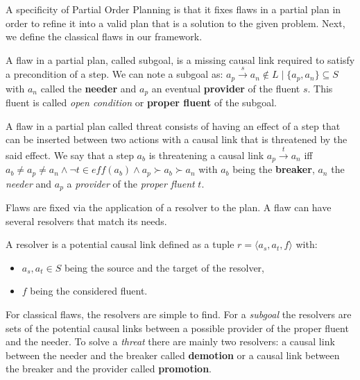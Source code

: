 A specificity of Partial Order Planning is that it fixes flaws in a
partial plan in order to refine it into a valid plan that is a solution
to the given problem. Next, we define the classical flaws in our
framework.

\begin{definition}[Subgoal]

A flaw in a partial plan, called subgoal, is a missing causal link
required to satisfy a precondition of a step. We can note a subgoal as:
\(a_p \xrightarrow{s} a_n \notin L \mid \{ a_p, a_n \} \subseteq S\)
with \(a_n\) called the \textbf{needer} and \(a_p\) an eventual
\textbf{provider} of the fluent \(s\). This fluent is called \emph{open
condition} or \textbf{proper fluent} of the subgoal.

\end{definition}

\begin{definition}[Threat]

A flaw in a partial plan called threat consists of having an effect of a
step that can be inserted between two actions with a causal link that is
threatened by the said effect. We say that a step \(a_b\) is threatening
a causal link \(a_p \xrightarrow{t} a_n\) iff
\(a_b \neq a_p \neq a_n \land \neg t \in eff(a_b) \land a_p \succ a_b \succ a_n\)
with \(a_b\) being the \textbf{breaker}, \(a_n\) the \emph{needer} and
\(a_p\) a \emph{provider} of the \emph{proper fluent} \(t\).

\end{definition}

Flaws are fixed via the application of a resolver to the plan. A flaw
can have several resolvers that match its needs.

\begin{definition}[Resolvers]\label{def:resolver}

A resolver is a potential causal link defined as a tuple
\(r = \langle a_s, a_t, f\rangle\) with:

\begin{itemize}
\tightlist
\item
  \(a_s, a_t \in S\) being the source and the target of the resolver,
\item
  \(f\) being the considered fluent.
\end{itemize}

\end{definition}

For classical flaws, the resolvers are simple to find. For a
\emph{subgoal} the resolvers are sets of the potential causal links
between a possible provider of the proper fluent and the needer. To
solve a \emph{threat} there are mainly two resolvers: a causal link
between the needer and the breaker called \textbf{demotion} or a causal
link between the breaker and the provider called \textbf{promotion}.

